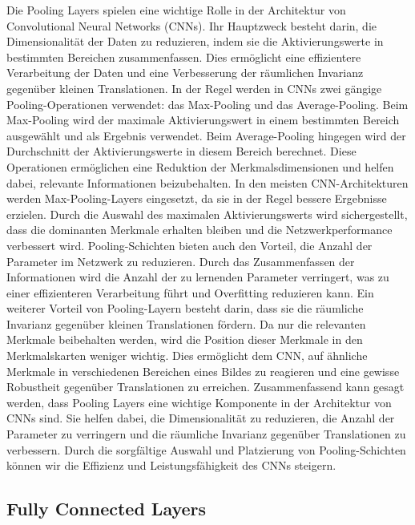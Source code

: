     Die Pooling Layers spielen eine wichtige Rolle in der Architektur von Convolutional Neural Networks (CNNs). 
    Ihr Hauptzweck besteht darin, die Dimensionalität der Daten zu reduzieren, indem sie die Aktivierungswerte in bestimmten Bereichen zusammenfassen. 
    Dies ermöglicht eine effizientere Verarbeitung der Daten und eine Verbesserung der räumlichen Invarianz gegenüber kleinen Translationen.
    In der Regel werden in CNNs zwei gängige Pooling-Operationen verwendet: das Max-Pooling und das Average-Pooling. 
    Beim Max-Pooling wird der maximale Aktivierungswert in einem bestimmten Bereich ausgewählt und als Ergebnis verwendet. 
    Beim Average-Pooling hingegen wird der Durchschnitt der Aktivierungswerte in diesem Bereich berechnet. 
    Diese Operationen ermöglichen eine Reduktion der Merkmalsdimensionen und helfen dabei, relevante Informationen beizubehalten.
    In den meisten CNN-Architekturen werden Max-Pooling-Layers eingesetzt, da sie in der Regel bessere Ergebnisse erzielen. 
    Durch die Auswahl des maximalen Aktivierungswerts wird sichergestellt, dass die dominanten Merkmale erhalten bleiben und die Netzwerkperformance verbessert wird.
    Pooling-Schichten bieten auch den Vorteil, die Anzahl der Parameter im Netzwerk zu reduzieren. 
    Durch das Zusammenfassen der Informationen wird die Anzahl der zu lernenden Parameter verringert, was zu einer effizienteren Verarbeitung führt und Overfitting reduzieren kann.
    Ein weiterer Vorteil von Pooling-Layern besteht darin, dass sie die räumliche Invarianz gegenüber kleinen Translationen fördern. Da nur die relevanten Merkmale beibehalten werden, wird die Position dieser Merkmale in den Merkmalskarten weniger wichtig. 
    Dies ermöglicht dem CNN, auf ähnliche Merkmale in verschiedenen Bereichen eines Bildes zu reagieren und eine gewisse Robustheit gegenüber Translationen zu erreichen.
    Zusammenfassend kann gesagt werden, dass Pooling Layers eine wichtige Komponente in der Architektur von CNNs sind. 
    Sie helfen dabei, die Dimensionalität zu reduzieren, die Anzahl der Parameter zu verringern und die räumliche Invarianz gegenüber Translationen zu verbessern. 
    Durch die sorgfältige Auswahl und Platzierung von Pooling-Schichten können wir die Effizienz und Leistungsfähigkeit des CNNs steigern.

\subsection{Fully Connected Layers}

